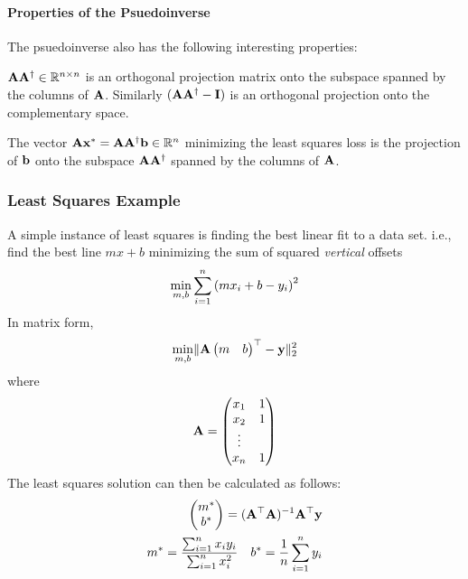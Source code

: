         \paragraph{Properties of the Psuedoinverse}
        The psuedoinverse also has the following interesting properties:
        \begin{prop}
        $\mathbf{A}\mathbf{A}^\dagger \in \mathbb{R}^{n \times n}$ is an {\rm orthogonal projection matrix} onto the subspace spanned by the columns of $\mathbf{A}$. Similarly $(\mathbf{A}\mathbf{A}^\dagger - \mathbf{I})$ is an orthogonal projection onto the complementary space.
        \end{prop}
        \begin{prop}
        The vector $\mathbf{A}\mathbf{x}^* = \mathbf{A}\mathbf{A}^\dagger {\bf b} \in \mathbb{R}^n$ minimizing the least squares loss is the projection of ${\bf b}$ onto the subspace $\mathbf{A}\mathbf{A}^\dagger$ spanned by the columns of $\mathbf{A}$.
        \end{prop}
        \subsubsection{Least Squares Example}
        A simple instance of least squares is finding the best linear fit to a data set. i.e., find the best line $mx + b$ minimizing the sum of squared {\em vertical} offsets
        \begin{align*}
            \min_{m,b} \sum_{i = 1}^n \left( mx_i + b - y_i\right)^2
        \end{align*}
        In matrix form,
        \begin{align*}
            \min_{m,b} \lVert \mathbf{A} \begin{pmatrix}m & b \end{pmatrix}^\top - {\bf y} \rVert_2^2
        \end{align*}
        where
        \begin{align*}
            \mathbf{A} = \begin{pmatrix}
            x_1 & 1 \\
            x_2 & 1 \\
            \vdots & \\
            x_n & 1
            \end{pmatrix}
        \end{align*}
        The least squares solution can then be calculated as follows:
        \begin{align*}
            \begin{pmatrix}
                    m^* \\
                    b^*
            \end{pmatrix} = (\mathbf{A}^\top \mathbf{A})^{-1} \mathbf{A}^\top {\bf y} \\
            m^* =
                    \frac{\sum_{i = 1}^n x_iy_i}{\sum_{i = 1}^n x_i^2} \quad  b^* = 
                    \frac{1}{n} \sum_{i = 1}^n y_i
        \end{align*}
